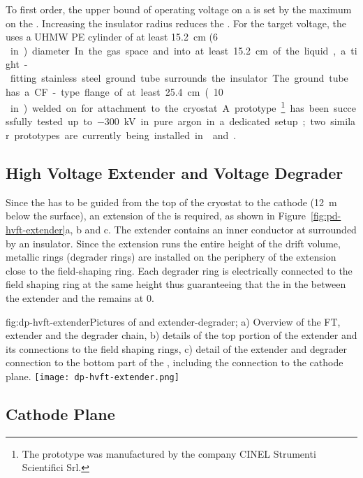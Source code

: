 To first order, the upper bound of operating voltage on a \fdth is set by the maximum \efield on the \fdth.  Increasing the insulator radius reduces the \efield.  For the target voltage, the \fdth uses a UHMW PE cylinder of at least \SI{15.2}{\cm} (\SI{6}\,in) diameter.  In the gas space and into at least \SI{15.2}{\cm} of the liquid, a tight-fitting stainless steel ground tube surrounds the insulator.  The ground tube has a CF-type 
flange of at least \SI{25.4}{\cm} (\SI{10}\,in) welded on for attachment to the cryostat.  A prototype\footnote{The prototype was manufactured by the company CINEL\texttrademark{} Strumenti Scientifici Srl.}  has been successfully tested up to \SI{-300}{\kV} in pure argon in a dedicated setup; two similar prototypes are currently being installed in  and .


\subsection{High Voltage Extender and Voltage Degrader}

Since the  has to be guided from the top of the cryostat to the cathode (\SI{12}{\m} below the  surface), an extension of the  \fdth is required, as shown in Figure~\ref{fig:pd-hvft-extender}a, b and c. The extender contains an inner conductor at \dptargetdriftvoltneg surrounded by an insulator. Since the extension runs the entire height of the drift volume, metallic rings (degrader rings) are installed on the periphery of the extension close to the field-shaping ring. Each degrader ring is electrically connected to the field shaping ring at the same height thus guaranteeing that the \efield in the \lar between the extender and the  remains at 0.


\begin{dunefigure}{fig:dp-hvft-extender}{Pictures of  \fdth and  extender-degrader; a) Overview of the  FT,  extender and the degrader chain, b) details of the top portion of the  extender and its connections to the field shaping rings, c) detail of the  extender and degrader connection to the bottom part of the , including the connection to the cathode plane.}
\texttt{[image: dp-hvft-extender.png]}
\end{dunefigure}

\subsection{Cathode Plane}

